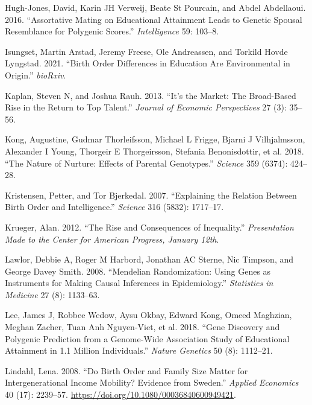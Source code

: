\documentclass[
]{article}
\newlength{\cslhangindent}
\newlength{\cslentryspacingunit} %
\newenvironment{CSLReferences}[2] %
 {%
  \setlength{\parindent}{0pt}
  \ifodd #1
  \let\oldpar\par
  \def\par{\hangindent=\cslhangindent\oldpar}
  \fi
  \setlength{\parskip}{#2\cslentryspacingunit}
 }%
 {}
\theoremstyle{definition}
\theoremstyle{definition}
\theoremstyle{definition}
\theoremstyle{definition}
\theoremstyle{remark}
\begin{document}
\begin{CSLReferences}{1}{0}
\leavevmode{}%
Hugh-Jones, David, Karin JH Verweij, Beate St Pourcain, and Abdel Abdellaoui. 2016. {``Assortative Mating on Educational Attainment Leads to Genetic Spousal Resemblance for Polygenic Scores.''} \emph{Intelligence} 59: 103--8.

\leavevmode{}%
Isungset, Martin Arstad, Jeremy Freese, Ole Andreassen, and Torkild Hovde Lyngstad. 2021. {``Birth Order Differences in Education Are Environmental in Origin.''} \emph{bioRxiv}.

\leavevmode{}%
Kaplan, Steven N, and Joshua Rauh. 2013. {``It's the Market: The Broad-Based Rise in the Return to Top Talent.''} \emph{Journal of Economic Perspectives} 27 (3): 35--56.

\leavevmode{}%
Kong, Augustine, Gudmar Thorleifsson, Michael L Frigge, Bjarni J Vilhjalmsson, Alexander I Young, Thorgeir E Thorgeirsson, Stefania Benonisdottir, et al. 2018. {``The Nature of Nurture: Effects of Parental Genotypes.''} \emph{Science} 359 (6374): 424--28.

\leavevmode{}%
Kristensen, Petter, and Tor Bjerkedal. 2007. {``Explaining the Relation Between Birth Order and Intelligence.''} \emph{Science} 316 (5832): 1717--17.

\leavevmode{}%
Krueger, Alan. 2012. {``The Rise and Consequences of Inequality.''} \emph{Presentation Made to the Center for American Progress, January 12th}.

\leavevmode{}%
Lawlor, Debbie A, Roger M Harbord, Jonathan AC Sterne, Nic Timpson, and George Davey Smith. 2008. {``Mendelian Randomization: Using Genes as Instruments for Making Causal Inferences in Epidemiology.''} \emph{Statistics in Medicine} 27 (8): 1133--63.

\leavevmode{}%
Lee, James J, Robbee Wedow, Aysu Okbay, Edward Kong, Omeed Maghzian, Meghan Zacher, Tuan Anh Nguyen-Viet, et al. 2018. {``Gene Discovery and Polygenic Prediction from a Genome-Wide Association Study of Educational Attainment in 1.1 Million Individuals.''} \emph{Nature Genetics} 50 (8): 1112--21.

\leavevmode{}%
Lindahl, Lena. 2008. {``Do Birth Order and Family Size Matter for Intergenerational Income Mobility? Evidence from Sweden.''} \emph{Applied Economics} 40 (17): 2239--57. \url{https://doi.org/10.1080/00036840600949421}.


\end{CSLReferences}
\end{document}
